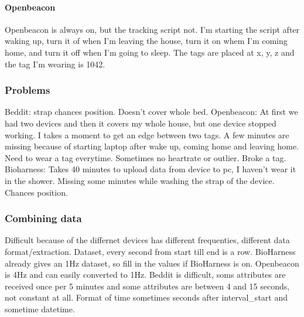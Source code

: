 			\paragraph{Openbeacon}
				Openbeacon is always on, but the tracking script not. I'm starting the script after waking up, turn it of when I'm leaving the house, turn it on whem I'm coming home, and turn it off when I'm going to sleep. The tags are placed at x, y, z and the tag I'm wearing is 1042. 
		\subsubsection{Problems}
			Beddit: strap chances position. Doesn't cover whole bed. 
			Openbeacon: At first we had two devices and then it covers my whole house, but one device stopped working. I takes a moment to get an edge between two tags. A few minutes are missing because of starting laptop after wake up, coming home and leaving home. Need to wear a tag everytime. Sometimes no heartrate or outlier. Broke a tag.
			Bioharness: Takes 40 minutes to upload data from device to pc, I haven't wear it in the shower. Missing some minutes while washing the strap of the device. Chances position. 
		\subsubsection{Combining data}
			Difficult because of the differnet devices has different frequenties, different data format/extraction. 
			Dataset, every second from start till end is a row. BioHarness already gives an 1Hz dataset, so fill in the values if BioHarness is on. 
			Openbeacon is 4Hz and can easily converted to 1Hz.
			Beddit is difficult, soms attributes are received once per 5 minutes and some attributes are between 4 and 15 seconds, not constant at all. Format of time sometimes seconds after interval\_start and sometime datetime.
		
